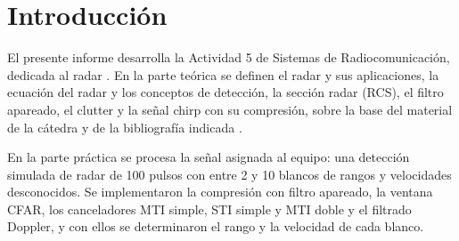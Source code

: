 \section{Introducción}
El presente informe desarrolla la Actividad 5 de Sistemas de Radiocomunicación, dedicada al radar \cite{consigna}. En la parte teórica se definen el radar y sus aplicaciones, la ecuación del radar y los conceptos de detección, la sección radar (RCS), el filtro apareado, el clutter y la señal chirp con su compresión, sobre la base del material de la cátedra \cite{apunte} y de la bibliografía indicada \cite{skolnik, richards, cumming}.

En la parte práctica se procesa la señal \senal{} asignada al equipo: una detección simulada de radar de 100 pulsos con entre 2 y 10 blancos de rangos y velocidades desconocidos. Se implementaron la compresión con filtro apareado, la ventana CFAR, los canceladores MTI simple, STI simple y MTI doble y el filtrado Doppler, y con ellos se determinaron el rango y la velocidad de cada blanco.
